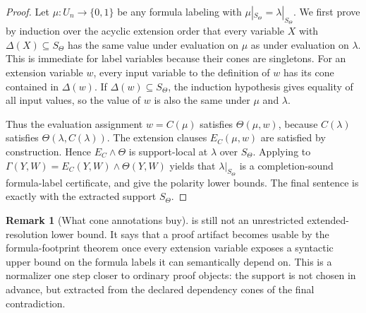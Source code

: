 \documentclass[11pt]{article}
\theoremstyle{definition}
\newtheorem{remark}[theorem]{Remark}
\newcommand{\bits}{\{0,1\}}
\begin{document}
\begin{proof}
Let \(\mu:U_n\to\bits\) be any formula labeling with \(\mu|_{S_\Theta}=\lambda|_{S_\Theta}\).  We first prove by induction over the acyclic extension order that every variable \(X\) with \(\Delta(X)\subseteq S_\Theta\) has the same value under evaluation on \(\mu\) as under evaluation on \(\lambda\).  This is immediate for label variables because their cones are singletons.  For an extension variable \(w\), every input variable to the definition of \(w\) has its cone contained in \(\Delta(w)\).  If \(\Delta(w)\subseteq S_\Theta\), the induction hypothesis gives equality of all input values, so the value of \(w\) is also the same under \(\mu\) and \(\lambda\).

Thus the evaluation assignment \(w=C(\mu)\) satisfies \(\Theta(\mu,w)\), because \(C(\lambda)\) satisfies \(\Theta(\lambda,C(\lambda))\).  The extension clauses \(E_C(\mu,w)\) are satisfied by construction.  Hence \(E_C\wedge\Theta\) is support-local at \(\lambda\) over \(S_\Theta\).  Applying  to \(\Gamma(Y,W)=E_C(Y,W)\wedge\Theta(Y,W)\) yields that \(\lambda|_{S_\Theta}\) is a completion-sound formula-label certificate, and  give the polarity lower bounds.  The final sentence is exactly  with the extracted support \(S_\Theta\).
\end{proof}

\begin{remark}[What cone annotations buy]\label{rem:dependency-cone-scope}
 is still not an unrestricted extended-resolution lower bound.  It says that a proof artifact becomes usable by the formula-footprint theorem once every extension variable exposes a syntactic upper bound on the formula labels it can semantically depend on.  This is a normalizer one step closer to ordinary proof objects: the support is not chosen in advance, but extracted from the declared dependency cones of the final contradiction.
\end{remark}
\end{document}
